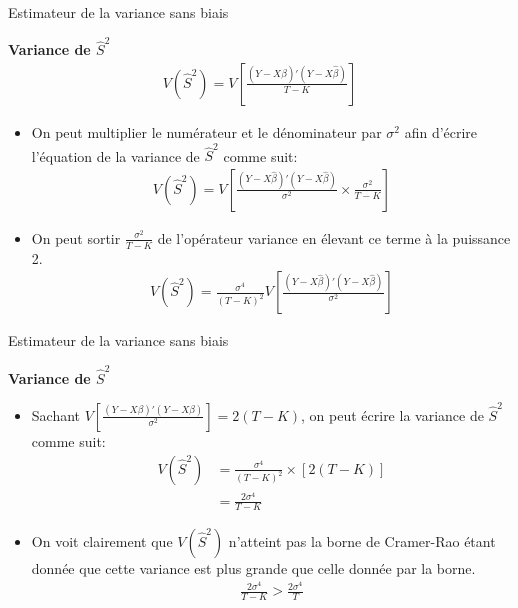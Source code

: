 \documentclass{beamer}
\begin{document}
\begin{frame}{Estimateur de la variance sans biais}

\textbf{Variance de $\hat{S}^2$}
\begin{align*}
V(\hat{S}^2)=V \left[ \frac{(Y-X \hat{\beta})'(Y-X \hat{\beta})}{T-K}\right]
\end{align*}
\begin{itemize}
\item On peut multiplier le numérateur et le dénominateur par $\sigma^2$ afin d'écrire l'équation de la variance de $\hat{S}^2$ comme suit:
\begin{align*}
V(\hat{S}^2)=V \left[ \frac{(Y-X \hat{\beta})'(Y-X \hat{\beta})}{\sigma^2} \times \frac{\sigma^2}{T-K}\right]
\end{align*}
\item On peut sortir $\frac{\sigma^2}{T-K}$ de l'opérateur variance en élevant ce terme à la puissance 2.
\begin{align*}
V(\hat{S}^2)= \frac{\sigma^4}{(T-K)^2} V\left[ \frac{(Y-X \hat{\beta})'(Y-X \hat{\beta})}{\sigma^2} \right]
\end{align*}
\end{itemize}
\end{frame}


\begin{frame}{Estimateur de la variance sans biais}

\textbf{Variance de $\hat{S}^2$}
\begin{itemize}
\item Sachant $V \left[ \frac{(Y-X \beta)'(Y-X \beta)}{\sigma^2}\right]=2(T-K)$, on peut écrire la variance de $\hat{S}^2$ comme suit:
\begin{align*}
V(\hat{S}^2) & = \frac{\sigma^4}{(T-K)^2} \times [2(T-K)] \\ & = \frac{2 \sigma^4}{T-K}
\end{align*}
\item On voit clairement que $V(\hat{S}^2)$ n'atteint pas la borne de Cramer-Rao étant donnée que cette variance est plus grande que celle donnée par la borne.
\begin{align*}
\frac{2 \sigma^4}{T-K} > \frac{2 \sigma^4}{T}
\end{align*}
\end{itemize}
\end{frame}
\end{document}
